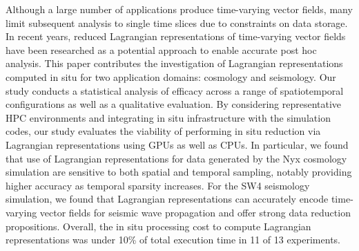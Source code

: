 Although a large number of applications produce time-varying vector fields, many limit subsequent analysis to single time slices due to constraints on data storage.
%
In recent years, reduced Lagrangian representations of time-varying vector fields have been researched as a potential approach to enable accurate post hoc analysis.
%
This paper contributes the investigation of Lagrangian representations computed in situ for two application domains: cosmology and seismology.
%
%
Our study conducts a statistical analysis of efficacy across a range of spatiotemporal configurations as well as a qualitative evaluation. %
%
By considering representative HPC environments and integrating in situ infrastructure with the simulation codes, our study evaluates the viability of performing in situ reduction via Lagrangian representations using GPUs as well as CPUs.
%
In particular, we found that use of Lagrangian representations for data generated by the Nyx cosmology simulation are sensitive to both spatial and temporal sampling, notably providing higher accuracy as temporal sparsity increases.
%
For the SW4 seismology simulation, we found that Lagrangian representations can accurately encode time-varying vector fields for seismic wave propagation and offer strong data reduction propositions.
%
%
Overall, the in situ processing cost to compute Lagrangian representations was under 10\% of total execution time in 11 of 13 experiments.
%
